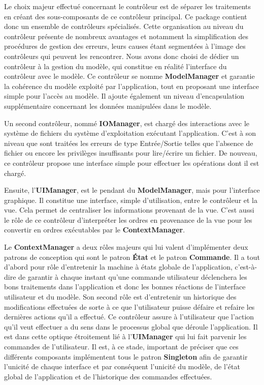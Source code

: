 \documentclass[paper=a4,fontsize=11pt]{report}
\numberwithin{equation}{section}		%
\numberwithin{figure}{section}		%
\numberwithin{table}{section}		%
\renewcommand{\bf}[1]{\textbf{#1}}
\begin{document}
Le choix majeur effectué concernant le contrôleur est de séparer les traitements en créant des sous-composants de ce contrôleur principal. Ce package contient donc un ensemble de  contrôleurs spécialisés. Cette organisation au niveau du contrôleur présente de nombreux avantages et notamment la simplification des procédures de gestion des erreurs, leurs causes étant segmentées à l'image des contrôleurs qui peuvent les rencontrer. 
Nous avons donc choisi de dédier un contrôleur à la gestion du modèle, qui constitue en réalité l'interface du contrôleur avec le modèle. Ce contrôleur se nomme \bf{ModelManager} et garantie la cohérence du modèle exploité par l'application, tout en proposant une interface simple pour l'accès au modèle. Il ajoute également un niveau d'encapsulation supplémentaire concernant les données manipulées dans le modèle. 

Un second contrôleur, nommé \bf{IOManager}, est chargé des interactions avec le système de fichiers du système d'exploitation exécutant l'application. C’est à son niveau que sont traitées les erreurs de type Entrée/Sortie telles que l'absence de fichier ou encore les privilèges insuffisants pour lire/écrire un fichier. De nouveau, ce contrôleur propose une interface simple pour effectuer les opérations dont il est chargé. 

Ensuite, l'\bf{UIManager}, est le pendant du \bf{ModelManager}, mais pour l'interface graphique. Il constitue une interface, simple d'utilisation, entre le contrôleur et la vue. Cela permet de centraliser les informations provenant de la vue. C'est aussi le rôle de ce contrôleur d'interpréter les ordres en provenance de la vue pour les convertir en ordres exécutables par le \bf{ContextManager}. 

Le \bf{ContextManager} a deux rôles majeurs qui lui valent d'implémenter deux patrons de conception qui sont le patron \bf{État} et le patron \bf{Commande}. Il a tout d'abord pour rôle d'entretenir la machine à états globale de l'application, c'est-à-dire de garantir à chaque instant qu'une commande utilisateur déclenchera les bons traitements dans l'application et donc les bonnes réactions de l'interface utilisateur et du modèle. Son second rôle est d'entretenir un historique des modifications effectuées de sorte à ce que l'utilisateur puisse défaire et refaire les dernières actions qu'il a effectué. Ce contrôleur assure à l'utilisateur que l'action qu'il veut effectuer a du sens dans le processus global que déroule l'application. Il est dans cette optique étroitement lié à l'\bf{UIManager} qui lui fait parvenir les commandes de l'utilisateur.
Il est, à ce stade, important de préciser que ces différents composants implémentent tous le patron \bf{Singleton} afin de garantir l'unicité de chaque interface et par conséquent l'unicité du modèle, de l'état global de l'application et de l'historique des commandes effectuées.
\end{document}
